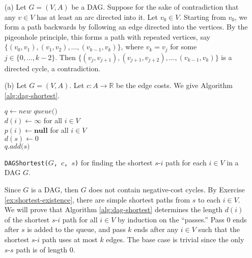 \documentclass[letterpaper,reqno,12pt]{article}
\newcommand{\RR}{\mathbb{R}}
\begin{document}
\begin{exercise}
  \begin{enumerate}
    \item[(a)] Let $G = (V, A)$ be a DAG. Suppose for the sake of contradiction that any $v \in V$ has at least an arc directed into it. Let $v_0 \in V$. Starting from $v_0$, we form a path backwards by following an edge directed into the vertices. By the pigeonhole principle, this forms a path with repeated vertices, say $\{ (v_0, v_1), (v_1, v_2), \ldots, (v_{k - 1}, v_k) \}$, where $v_k = v_j$ for some $j \in \{ 0, \ldots, k - 2 \}$. Then $\{ (v_j, v_{j + 1}), (v_{j + 1}, v_{j + 2}), \ldots, (v_{k - 1}, v_k) \}$ is a directed cycle, a contradiction.
    \item[(b)] Let $G = (V, A)$. Let $c : A \to \RR$ be the edge costs. We give Algorithm \ref{alg:dag-shortest}.

    \begin{algorithm}
      $q \leftarrow \textit{new queue()}$ \\
      $d(i) \leftarrow \infty$ for all $i \in V$ \\
      $p(i) \leftarrow \textbf{null}$ for all $i \in V$ \\
      $d(s) \leftarrow 0$ \\
      $q.\textit{add($s$)}$ \\
      \caption{{\tt DAGShortest($G$, $c$, $s$)} for finding the shortest $s$-$i$ path for each $i \in V$ in a DAG $G$.}
      \label{alg:dag-shortest}
    \end{algorithm}

    Since $G$ is a DAG, then $G$ does not contain negative-cost cycles. By Exercise \ref{ex:shortest-existence}, there are simple shortest paths from $s$ to each $i \in V$. We will prove that Algorithm \ref{alg:dag-shortest} determines the length $d(i)$ of the shortest $s$-$i$ path for all $i \in V$ by induction on the ``passes.'' Pass $0$ ends after $s$ is added to the queue, and pass $k$ ends after any $i \in V$ such that the shortest $s$-$i$ path uses at most $k$ edges. The base case is trivial since the only $s$-$s$ path is of length $0$.


\end{enumerate}
\end{exercise}
\end{document}
